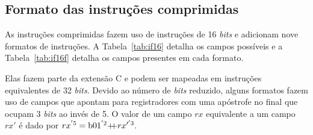 \subsection{Formato das instruções comprimidas}
\label{sec:instCfmt}

  As instruções comprimidas fazem uso de instruções de 16 \emph{bits} e adicionam nove formatos de instruções.
  A Tabela~\ref{tab:if16} detalha os campos possíveis e a Tabela~\ref{tab:if16f} detalha os campos 
  presentes em cada formato.

  Elas fazem parte da extensão C e podem ser mapeadas em instruções equivalentes de 32 \emph{bits}. Devido ao 
  número de \emph{bits} reduzido, alguns formatos fazem uso de campos que apontam para registradores com uma 
  apóstrofe no final que ocupam 3 \emph{bits} ao invés de 5. O valor de um campo $rx$ equivalente a um campo $rx'$
  é dado por $rx^{'5} = \text{b}01^{'2}  {+\!\!+}  rx'^{'3}$.


